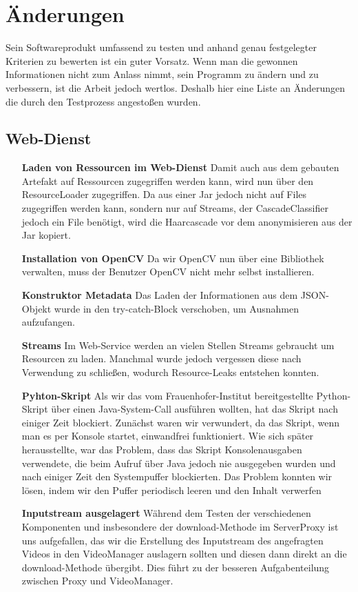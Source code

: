 \chapter{Änderungen} \label{Changelog}
Sein Softwareprodukt umfassend zu testen und anhand genau festgelegter Kriterien zu bewerten ist ein guter Vorsatz. Wenn man die gewonnen Informationen nicht zum Anlass nimmt, sein Programm zu ändern und zu verbessern, ist die Arbeit jedoch wertlos. Deshalb hier eine Liste an Änderungen die durch den Testprozess angestoßen wurden.
\section{Web-Dienst}
\begin{itemize}
\item[\textbf{Laden von Ressourcen im Web-Dienst}] Damit auch aus dem gebauten Artefakt auf Ressourcen zugegriffen werden kann, wird nun über den ResourceLoader zugegriffen. Da aus einer Jar jedoch nicht auf Files zugegriffen werden kann, sondern nur auf Streams, der CascadeClassifier jedoch ein File benötigt, wird die Haarcascade vor dem anonymisieren aus der Jar kopiert.
\item[\textbf{Installation von OpenCV}] Da wir OpenCV nun über eine Bibliothek verwalten, muss der Benutzer OpenCV nicht mehr selbst installieren.
\item[\textbf{Konstruktor Metadata}] Das Laden der Informationen aus dem JSON-Objekt wurde in den try-catch-Block verschoben, um Ausnahmen aufzufangen.
\item[\textbf{Streams}] Im Web-Service werden an vielen Stellen Streams gebraucht um Resourcen zu laden. Manchmal wurde jedoch vergessen diese nach Verwendung zu schließen, wodurch Resource-Leaks entstehen konnten.
\item[\textbf{Pyhton-Skript}] Als wir das vom Frauenhofer-Institut bereitgestellte Python-Skript über einen Java-System-Call ausführen wollten, hat das Skript nach einiger Zeit blockiert. Zunächst waren wir verwundert, da das Skript, wenn man es per Konsole startet, einwandfrei funktioniert. Wie sich später herausstellte, war das Problem, dass das Skript Konsolenausgaben verwendete, die beim Aufruf über Java jedoch nie ausgegeben wurden und nach einiger Zeit den Systempuffer blockierten. Das Problem konnten wir lösen, indem wir den Puffer periodisch leeren und den Inhalt verwerfen
\item[\textbf{Inputstream ausgelagert}] Während dem Testen der verschiedenen Komponenten und insbesondere der download-Methode im ServerProxy ist uns aufgefallen, das wir die Erstellung des Inputstream des angefragten Videos in den VideoManager auslagern sollten und diesen dann direkt an die download-Methode übergibt. Dies führt zu der besseren Aufgabenteilung zwischen Proxy und VideoManager.
\end{itemize}
